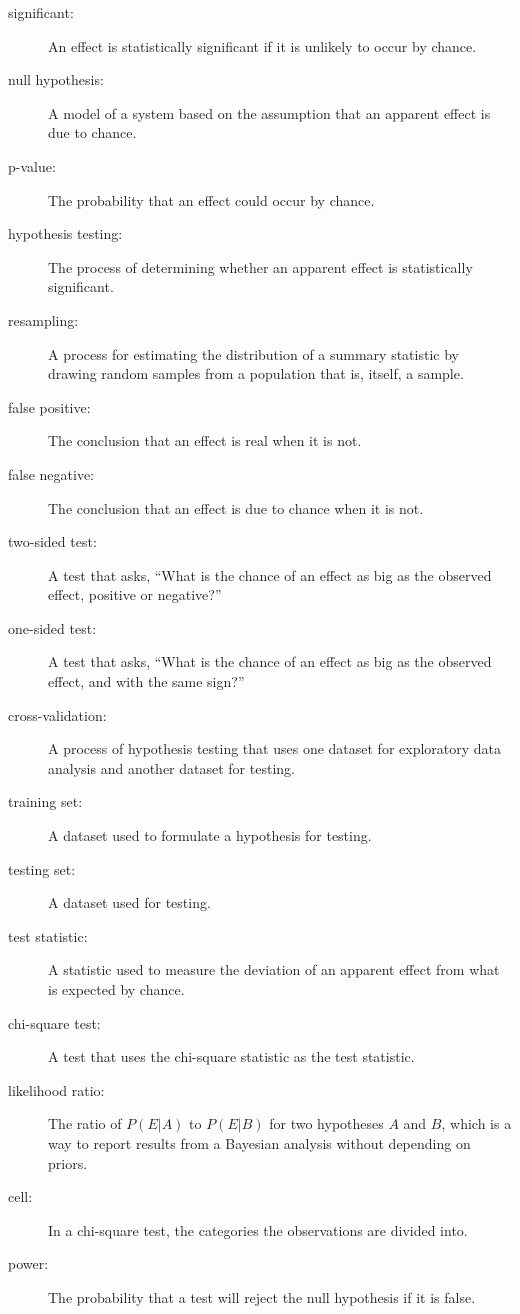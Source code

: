 \documentclass[12pt]{book}
\begin{document}
\begin{description}

\item[significant:] An effect is statistically significant if it is unlikely
to occur by chance.

\item[null hypothesis:] A model of a system based on the assumption that
an apparent effect is due to chance.

\item[p-value:] The probability that an effect could occur by chance.

\item[hypothesis testing:] The process of determining whether an apparent
effect is statistically significant.

\item[resampling:] A process for estimating the distribution of a summary
statistic by drawing random samples from a population that is, itself, a
sample.

\item[false positive:] The conclusion that an effect is real when it is not.

\item[false negative:] The conclusion that an effect is due to chance when it
is not.

\item[two-sided test:] A test that asks, ``What is the chance of an effect
as big as the observed effect, positive or negative?''

\item[one-sided test:] A test that asks, ``What is the chance of an effect
as big as the observed effect, and with the same sign?''

\item[cross-validation:] A process of hypothesis testing that uses one
dataset for exploratory data analysis and another dataset for testing.

\item[training set:] A dataset used to formulate a hypothesis for testing.

\item[testing set:] A dataset used for testing.

\item[test statistic:] A statistic used to measure the deviation of an
apparent effect from what is expected by chance.

\item[chi-square test:] A test that uses the chi-square statistic as
the test statistic.

\item[likelihood ratio:] The ratio of $P(E|A)$ to $P(E|B)$ for two
hypotheses $A$ and $B$, which is a way to report
results from a Bayesian analysis without depending on priors.

\item[cell:] In a chi-square test, the categories the observations are
divided into.

\item[power:] The probability that a test will reject the null hypothesis
if it is false.

\end{description}
\end{document}
